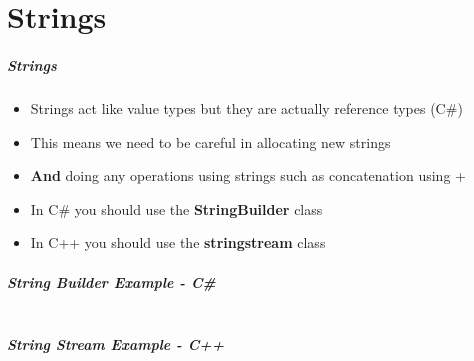 \part{Strings}
\frame{\partpage}

\begin{frame}
\frametitle{Strings}
	\begin{itemize}
		\item Strings act like value types but they are actually reference types (C\#)
		\item This means we need to be careful in allocating new strings
		\item \textbf{And} doing any operations using strings such as concatenation using +
		\item In C\# you should use the \textbf{StringBuilder} class 
		\item In C++ you should use the \textbf{stringstream} class
	\end{itemize}
\end{frame}

\begin{frame}[fragile]
\frametitle{String Builder Example - C\#}
	\begin{lstlisting}
	\end{lstlisting}
\end{frame}

\begin{frame}[fragile]
\frametitle{String Stream Example - C++}
	\begin{lstlisting}
	\end{lstlisting}
\end{frame}